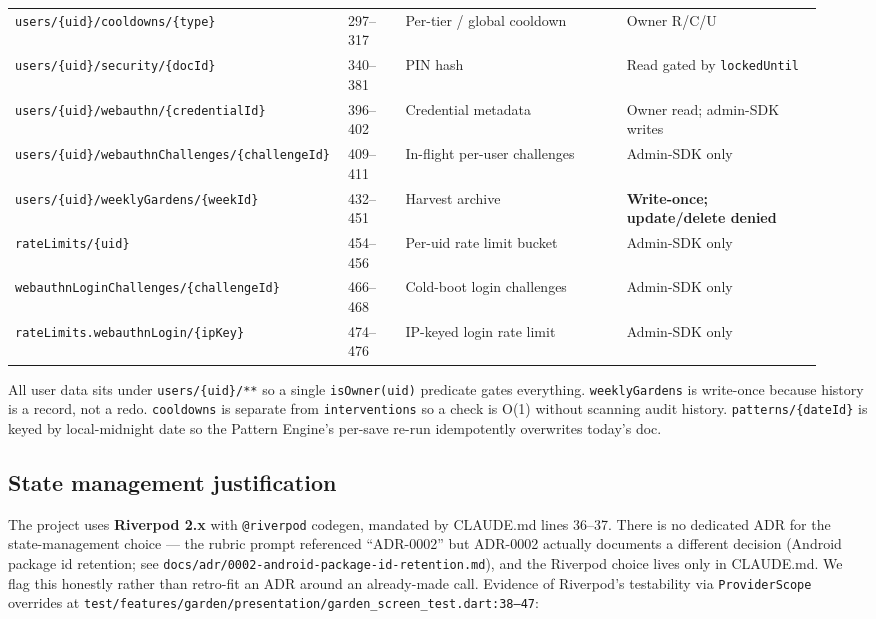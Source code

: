 \documentclass[11pt,a4paper]{article}
\begin{document}
{\begin{longtable}{@{} >{\raggedright\arraybackslash}p{0.36\linewidth} p{0.07\linewidth} >{\raggedright\arraybackslash}p{0.27\linewidth} >{\raggedright\arraybackslash}p{0.24\linewidth} @{}}
\texttt{users/\allowbreak{}\{uid\}/\allowbreak{}cooldowns/\allowbreak{}\{type\}}                   & 297--317 & Per-tier / global cooldown       & Owner R/C/U \\
\texttt{users/\allowbreak{}\{uid\}/\allowbreak{}security/\allowbreak{}\{docId\}}                   & 340--381 & PIN hash                         & Read gated by \texttt{lockedUntil} \\
\texttt{users/\allowbreak{}\{uid\}/\allowbreak{}webauthn/\allowbreak{}\{credentialId\}}            & 396--402 & Credential metadata              & Owner read; admin-SDK writes \\
\texttt{users/\allowbreak{}\{uid\}/\allowbreak{}webauthnChallenges/\allowbreak{}\{challengeId\}}   & 409--411 & In-flight per-user challenges    & Admin-SDK only \\
\texttt{users/\allowbreak{}\{uid\}/\allowbreak{}weeklyGardens/\allowbreak{}\{weekId\}}             & 432--451 & Harvest archive                  & \textbf{Write-once; update/delete denied} \\
\texttt{rateLimits/\allowbreak{}\{uid\}}                                 & 454--456 & Per-uid rate limit bucket        & Admin-SDK only \\
\texttt{webauthnLoginChallenges/\allowbreak{}\{challengeId\}}            & 466--468 & Cold-boot login challenges       & Admin-SDK only \\
\texttt{rateLimits.webauthnLogin/\allowbreak{}\{ipKey\}}                 & 474--476 & IP-keyed login rate limit        & Admin-SDK only \\
\bottomrule
\end{longtable}
}
All user data sits under \texttt{users/\{uid\}/**} so a single
\texttt{isOwner(uid)} predicate gates everything. \texttt{weeklyGardens}
is write-once because history is a record, not a redo. \texttt{cooldowns}
is separate from \texttt{interventions} so a check is O(1) without
scanning audit history. \texttt{patterns/\{dateId\}} is keyed by
local-midnight date so the Pattern Engine's per-save re-run idempotently
overwrites today's doc.

\subsection{State management justification}

The project uses \textbf{Riverpod 2.x} with \texttt{@riverpod} codegen,
mandated by CLAUDE.md lines 36--37. There is no dedicated ADR for the
state-management choice --- the rubric prompt referenced ``ADR-0002''
but ADR-0002 actually documents a different decision (Android package
id retention; see \texttt{docs/adr/0002-android-package-id-retention.md}),
and the Riverpod choice lives only in CLAUDE.md. We flag this honestly
rather than retro-fit an ADR around an already-made call. Evidence of
Riverpod's testability via \texttt{ProviderScope} overrides at
\texttt{test/features/garden/presentation/garden\_screen\_test.dart:38--47}:
\end{document}
